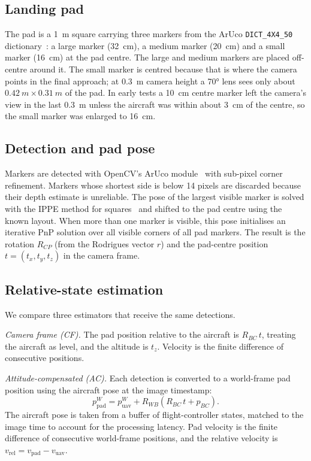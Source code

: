 \documentclass[conference]{IEEEtran}
\begin{document}
\subsection{Landing pad}
The pad is a \SI{1}{m} square carrying three markers from the ArUco \texttt{DICT\_4X4\_50}
dictionary~\cite{garrido2014aruco}: a large marker (\SI{32}{cm}), a medium marker
(\SI{20}{cm}) and a small marker (\SI{16}{cm}) at the pad centre. The large and medium
markers are placed off-centre around it. The small marker is centred because that is where the camera points in the final
approach; at \SI{0.3}{m} camera height a \ang{70} lens sees only about
$\SI{0.42}{m}\times\SI{0.31}{m}$ of the pad. In early tests a \SI{10}{cm} centre marker
left the camera's view in the last \SI{0.3}{m} unless the aircraft was within about
\SI{3}{cm} of the centre, so the small marker was enlarged to \SI{16}{cm}.

\subsection{Detection and pad pose}
Markers are detected with OpenCV's ArUco module~\cite{garrido2014aruco,romero2018speeded} with
sub-pixel corner refinement. Markers whose shortest side is below 14 pixels are discarded
because their depth estimate is unreliable. The pose of the largest visible marker is solved
with the IPPE method for squares~\cite{collins2014infinitesimal} and shifted to the pad centre
using the known layout. When more than one marker is visible, this pose initialises an
iterative PnP solution over all visible corners of all pad markers. The result is the
rotation $R_{CP}$ (from the Rodrigues vector $r$) and the pad-centre position
$t=(t_x,t_y,t_z)$ in the camera frame.

\subsection{Relative-state estimation}
\label{sec:est}
We compare three estimators that receive the same detections.

\emph{Camera frame (CF).} The pad position relative to the aircraft is $R_{BC}\,t$, treating
the aircraft as level, and the altitude is $t_z$. Velocity is the finite difference of
consecutive positions.

\emph{Attitude-compensated (AC).} Each detection is converted to a world-frame pad position
using the aircraft pose at the image timestamp:
\begin{equation}
p^{W}_{\text{pad}} = p^{W}_{\text{uav}} + R_{WB}\left(R_{BC}\,t + p_{BC}\right).
\label{eq:comp}
\end{equation}
The aircraft pose is taken from a buffer of flight-controller states, matched to the image
time to account for the processing latency. Pad velocity is the finite difference
of consecutive world-frame positions, and the relative velocity is
$v_{\text{rel}} = v_{\text{pad}} - v_{\text{uav}}$.
\end{document}
